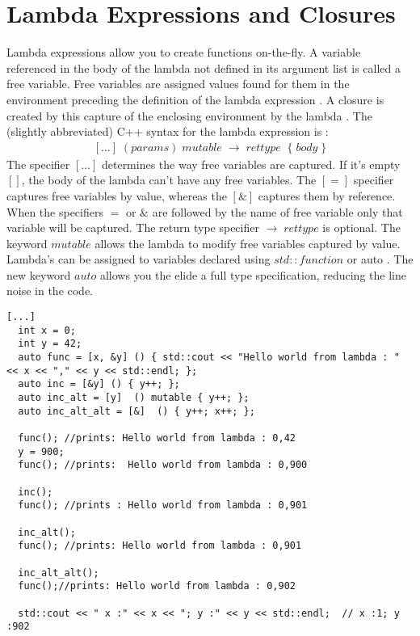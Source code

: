 \documentclass[12pt,fleqn]{article}
\begin{document}
\section*{Lambda Expressions and Closures}
Lambda expressions allow you to create functions on-the-fly. 
A variable referenced in the body of the lambda not defined in its argument list is called a free variable. 
Free variables are assigned values found for them in the environment preceding the definition of the lambda expression \cite{field}. 
A closure is created by this capture of the enclosing environment by the lambda \cite{field, scott}. 
\newline
The (slightly abbreviated) C++ syntax for the lambda expression is \cite{lambdaref}:
\[
\begin{array}{rll}
[...] \;  (params) \; mutable \;  \rightarrow \; rettype \;\; \{ \; body \;\}
\end{array}
\]
The specifier $[...]$ determines the way free variables are captured.
If it's empty $[]$, the body of the lambda can't have any free variables.
The $[=]$ specifier captures free variables by value, whereas the $[\&]$ captures them by reference.
When the specifiers $=$ or $\&$ are followed by the name of free variable only that variable will be captured. 
The return type specifier $\rightarrow \; rettype$ is optional.
The keyword $mutable$ allows the lambda to modify free variables captured by value. 
\newline
Lambda's can be assigned to variables declared using $std::function$ \cite{std::function} or auto \cite{auto}.
The new keyword $auto$ allows you the elide a full type specification, reducing the line noise in the code.
%
\begin{lstlisting}[caption=various ways lambda's capture the environment , label=listing1]
[...]
  int x = 0;
  int y = 42;
  auto func = [x, &y] () { std::cout << "Hello world from lambda : " << x << "," << y << std::endl; };
  auto inc = [&y] () { y++; };
  auto inc_alt = [y]  () mutable { y++; };
  auto inc_alt_alt = [&]  () { y++; x++; };

  func(); //prints: Hello world from lambda : 0,42
  y = 900;
  func(); //prints:  Hello world from lambda : 0,900

  inc();
  func(); //prints : Hello world from lambda : 0,901

  inc_alt();
  func(); //prints: Hello world from lambda : 0,901

  inc_alt_alt(); 
  func();//prints: Hello world from lambda : 0,902

  std::cout << " x :" << x << "; y :" << y << std::endl;  // x :1; y :902

\end{lstlisting}
\end{document}
